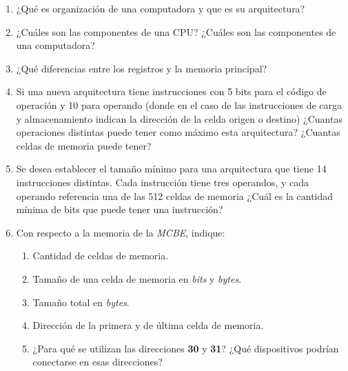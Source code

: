 \documentclass[12pt]{article}
\begin{document}
\begin{enumerate}
    \itemsep2pt \parskip0pt 

    \item ¿Qué es organización de una computadora y que es su arquitectura?

    \item ¿Cuáles son las componentes de una CPU? ¿Cuáles son las componentes
        de una computadora?

    \item ¿Qué diferencias entre los registros y la memoria principal?

    \item Si una nueva arquitectura tiene instrucciones con 5 bits para el
        código de operación y 10 para operando (donde en el caso de las
        instrucciones de carga y almacenamiento indican la dirección de la
        celda origen o destino) ¿Cuantas operaciones distintas puede tener
        como máximo esta arquitectura? ¿Cuantas celdas de memoria puede tener?

    \item Se desea establecer el tamaño mínimo para una arquitectura que tiene
        14 instrucciones distintas. Cada instrucción tiene tres operandos, y
        cada operando referencia una de las 512 celdas de memoria ¿Cuál es la
        cantidad mínima de bits que puede tener una instrucción?

    \item Con respecto a la memoria de la \emph{MCBE}, indique:

        \begin{enumerate}

            \item Cantidad de celdas de memoria.

            \item Tamaño de una celda de memoria en \emph{bits}
                y \emph{bytes}.

            \item Tamaño total en \emph{bytes}.

            \item Dirección de la primera y de última celda de memoria.

            \item ¿Para qué se utilizan las direcciones \textbf{30} y
                \textbf{31}? ¿Qué dispositivos podrían conectarse en esas
                direcciones?

        \end{enumerate}


\end{enumerate}
\end{document}
